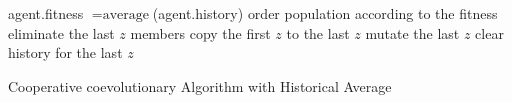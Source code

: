\begin{algorithm}[th]
 \SetAlgoLined
 {
   {
   	   agent.fitness $= \text{average}$(agent.history) \;
   }
 	order population according to the fitness\;
 	eliminate the last $z$ members\;
 	copy the first $z$ to the last $z$\;
 	mutate the last $z$\;
 	clear history for the last $z$\;
 }
 
\caption{Cooperative coevolutionary Algorithm with Historical Average}
\label{Alg:CCEA-AA}
\end{algorithm}





